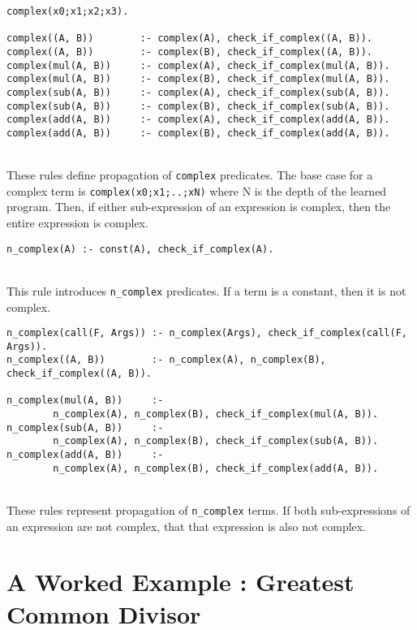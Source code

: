 \begin{lstlisting}
complex(x0;x1;x2;x3).

complex((A, B))        :- complex(A), check_if_complex((A, B)).
complex((A, B))        :- complex(B), check_if_complex((A, B)).
complex(mul(A, B))     :- complex(A), check_if_complex(mul(A, B)).
complex(mul(A, B))     :- complex(B), check_if_complex(mul(A, B)).
complex(sub(A, B))     :- complex(A), check_if_complex(sub(A, B)).
complex(sub(A, B))     :- complex(B), check_if_complex(sub(A, B)).
complex(add(A, B))     :- complex(A), check_if_complex(add(A, B)).
complex(add(A, B))     :- complex(B), check_if_complex(add(A, B)).
\end{lstlisting}
\mbox{} \\
These rules define propagation of \lstinline{complex} predicates. The base case for a complex term is \lstinline{complex(x0;x1;..;xN)} where N is the depth of the learned program. Then, if either sub-expression of an expression is complex, then the entire expression is complex. \\

\begin{lstlisting}
n_complex(A) :- const(A), check_if_complex(A).
\end{lstlisting}
\mbox{} \\
This rule introduces \lstinline{n_complex} predicates. If a term is a constant, then it is not complex. \\ %

\begin{lstlisting}
n_complex(call(F, Args)) :- n_complex(Args), check_if_complex(call(F, Args)).
n_complex((A, B))        :- n_complex(A), n_complex(B), check_if_complex((A, B)).

n_complex(mul(A, B))     :- 
		n_complex(A), n_complex(B), check_if_complex(mul(A, B)).
n_complex(sub(A, B))     :- 
		n_complex(A), n_complex(B), check_if_complex(sub(A, B)).
n_complex(add(A, B))     :- 
		n_complex(A), n_complex(B), check_if_complex(add(A, B)).
\end{lstlisting}
\mbox{} \\
These rules represent propagation of \lstinline{n_complex} terms. If both sub-expressions of an expression are not complex, that that expression is also not complex. \\ %

\pagebreak

\section{A Worked Example : Greatest Common Divisor}

